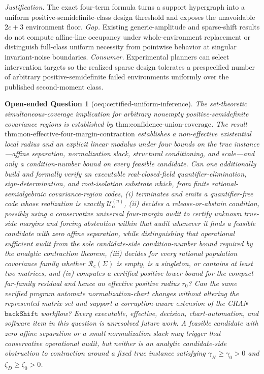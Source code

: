 \documentclass{article}
\newtheorem{openendedquestion}{Open-ended Question}
\begin{document}
\par\smallskip\noindent \textit{Justification.} The exact four-term formula turns a support hypergraph into a uniform positive-semidefinite-class design threshold and exposes the unavoidable \(2c+3\) environment floor. \textit{Gap.} Existing generic-amplitude and sparse-shift results do not compute affine-line occupancy under whole-environment replacement or distinguish full-class uniform necessity from pointwise behavior at singular invariant-noise boundaries. \textit{Consumer.} Experimental planners can select intervention targets so the realized sparse design tolerates a prespecified number of arbitrary positive-semidefinite failed environments uniformly over the published second-moment class.

\begin{openendedquestion}[oeq:certified-uniform-inference]\label{oeq:certified-uniform-inference}
The set-theoretic simultaneous-coverage implication for arbitrary nonempty positive-semidefinite covariance regions is established by \(\text{thm:confidence-union-coverage}\). The result \(\text{thm:non-effective-four-margin-contraction}\) establishes a non-effective existential local radius and an explicit linear modulus under four bounds on the true instance---affine separation, normalization slack, structural conditioning, and scale---and only a condition-number bound on every feasible candidate. Can one additionally build and formally verify an executable real-closed-field quantifier-elimination, sign-determination, and root-isolation substrate which, from finite rational-semialgebraic covariance-region codes, (i) terminates and emits a quantifier-free code whose realization is exactly \(\mathcal U^{(n)}_\alpha\), (ii) decides a release-or-abstain condition, possibly using a conservative universal four-margin audit to certify unknown true-side margins and forcing abstention within that audit whenever it finds a feasible candidate with zero affine separation, while distinguishing that operational sufficient audit from the sole candidate-side condition-number bound required by the analytic contraction theorem, (iii) decides for every rational population covariance family whether \(\mathcal R_c(\Sigma)\) is empty, is a singleton, or contains at least two matrices, and (iv) computes a certified positive lower bound for the compact far-family residual and hence an effective positive radius \(r_0\)? Can the same verified program automate normalization-chart changes without altering the represented matrix set and support a corruption-aware extension of the CRAN \(\texttt{backShift}\) workflow? Every executable, effective, decision, chart-automation, and software item in this question is unresolved future work. A feasible candidate with zero affine separation or a small normalization slack may trigger that conservative operational audit, but neither is an analytic candidate-side obstruction to contraction around a fixed true instance satisfying \(\gamma_H\geq\gamma_0>0\) and \(\zeta_D\geq\zeta_0>0\).
\end{openendedquestion}
\end{document}
